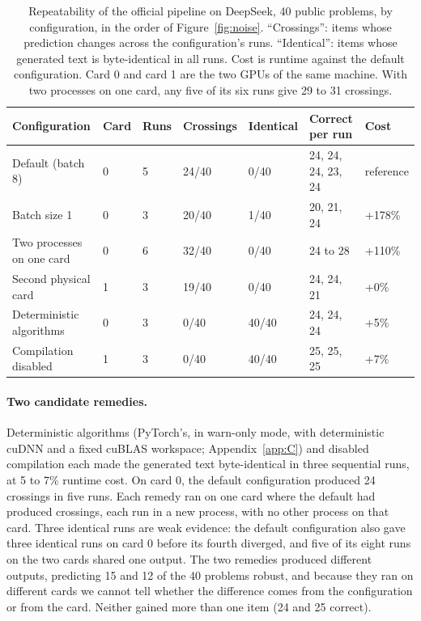 \documentclass{article}
\begin{document}
\begin{table}[t]
\caption{Repeatability of the official pipeline on DeepSeek, 40 public problems, by configuration, in the order of Figure~\ref{fig:noise}. ``Crossings'': items whose prediction changes across the configuration's runs. ``Identical'': items whose generated text is byte-identical in all runs. Cost is runtime against the default configuration. Card 0 and card 1 are the two GPUs of the same machine. With two processes on one card, any five of its six runs give 29 to 31 crossings.}
\label{tab:reexec}
\centering
\small
\begin{tabular}{@{}lllllll@{}}
\toprule
\textbf{Configuration} & \textbf{Card} & \textbf{Runs} & \textbf{Crossings} & \textbf{Identical} & \textbf{Correct per run} & \textbf{Cost} \\
\midrule
Default (batch 8) & 0 & 5 & 24/40 & 0/40 & 24, 24, 24, 23, 24 & reference \\
Batch size 1 & 0 & 3 & 20/40 & 1/40 & 20, 21, 24 & +178\% \\
Two processes on one card & 0 & 6 & 32/40 & 0/40 & 24 to 28 & +110\% \\
Second physical card & 1 & 3 & 19/40 & 0/40 & 24, 24, 21 & +0\% \\
Deterministic algorithms & 0 & 3 & 0/40 & 40/40 & 24, 24, 24 & +5\% \\
Compilation disabled & 1 & 3 & 0/40 & 40/40 & 25, 25, 25 & +7\% \\
\bottomrule
\end{tabular}
\end{table}

\paragraph{Two candidate remedies.} Deterministic algorithms (PyTorch's, in warn-only mode, with deterministic cuDNN and a fixed cuBLAS workspace; Appendix~\ref{app:C}) and disabled compilation each made the generated text byte-identical in three sequential runs, at 5 to 7\% runtime cost. On card 0, the default configuration produced 24 crossings in five runs. Each remedy ran on one card where the default had produced crossings, each run in a new process, with no other process on that card. Three identical runs are weak evidence: the default configuration also gave three identical runs on card 0 before its fourth diverged, and five of its eight runs on the two cards shared one output. The two remedies produced different outputs, predicting 15 and 12 of the 40 problems robust, and because they ran on different cards we cannot tell whether the difference comes from the configuration or from the card. Neither gained more than one item (24 and 25 correct).
\end{document}
